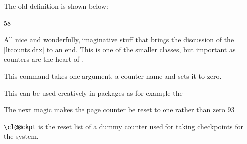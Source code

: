 \begin{multicols}{2}
\begin{teXX}
\end{teXX}

The old definition is shown below:

\begin{teXX}
58 \def\@fnsymbol#1{\ensuremath{\ifcase#1\or *\or \dagger\or \ddagger\or
59 \mathsection\or \mathparagraph\or \|\or **\or \dagger\dagger
60 \or \ddagger\ddagger \else\@ctrerr\fi}}
\end{teXX}

All nice and wonderfully, imaginative stuff that brings the discussion of the |ltcounts.dtx| to an end. This is one of the smaller classes, but important as counters are the heart of \latex. 




This command takes one argument, a counter name and sets it to zero.

\begin{Code}
 \def\@stpelt#1{\global\csname c@#1\endcsname \z@}
\end{Code}


This can be used creatively in packages as for example the  

\begin{Code}
The next magic makes the page counter be reset to one rather than zero
93 \renewcommand\@stpelt[1]{%
94 \global\csname c@#1\endcsname
95 \expandafter\ifx \csname c@#1\endcsname \c@page
96 \@ne
97 \else
98 \z@
99 \fi
100 }
\end{Code}



\texttt{\textbackslash cl@@ckpt}
 is the  reset list of a dummy counter 
used for taking checkpoints for the  system.
\end{multicols}

\makeatletter
\def\@elt{,   }


\topline

{\footnotesize 
\cl@@ckpt 
}

\bottomline


\begin{teXX}
 \def\cl@@ckpt{\@elt{page}}
\end{teXX}

